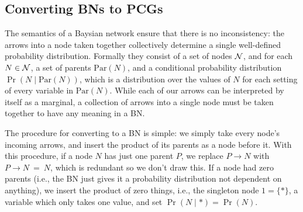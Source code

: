 \documentclass{article}
\begin{document}
	
	\subsection{Converting BNs to PCGs}
	
	\label{sec:convert2bn}
	The semantics of a Baysian network ensure that there is no inconsistency: the arrows into a node taken together collectively determine a single well-defined probability distribution. Formally they consist of a set of nodes $\cal N$, and for each $N \in \cal N$, a set of parents $\mathrm{Par}(N)$, and a conditional probability distribution $\Pr( N \mid \mathrm{Par}(N))$, which is a distribution over the values of $N$ for each setting of every variable in $\mathrm{Par}(N)$. While each of our arrows can be interpreted by itself as a marginal, a collection of arrows into a single node must be taken together to have any meaning in a BN. 
	
	The procedure for converting to a BN is simple: we simply take every node's incoming arrows, and insert the product of its parents as a node before it. With this procedure, if a node $N$ has just one parent $P$, we replace $P \to N$ with $P \to N ~=~ N$, which is redundant so we don't draw this. If a node had zero parents (i.e., the BN just gives it a probability distribution not dependent on anything), we insert the product of zero things, i.e., the singleton node $1 = \{*\}$, a variable which only takes one value, and set $\Pr(N \mid *) = \Pr(N)$. 
	
\end{document}
